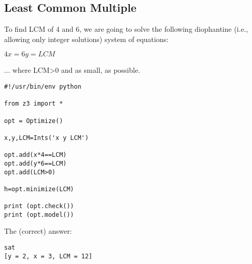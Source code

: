\subsection{Least Common Multiple}

To find LCM of 4 and 6, we are going to solve the following diophantine (i.e., allowing only integer solutions) system of equations:

$4x = 6y = LCM$

... where LCM>0 and as small, as possible.

\begin{lstlisting}
#!/usr/bin/env python

from z3 import *

opt = Optimize()

x,y,LCM=Ints('x y LCM')

opt.add(x*4==LCM)
opt.add(y*6==LCM)
opt.add(LCM>0)

h=opt.minimize(LCM)

print (opt.check())
print (opt.model())
\end{lstlisting}

The (correct) answer:

\begin{lstlisting}
sat
[y = 2, x = 3, LCM = 12]
\end{lstlisting}

